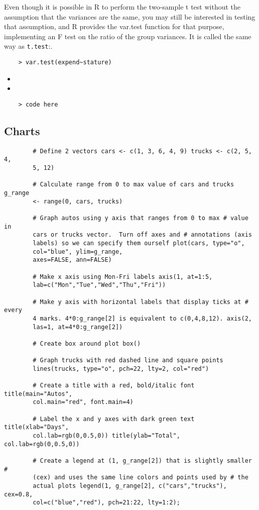 \documentclass[a4paper,12pt]{article}
\begin{document}
	
	Even though it is possible in R to perform the two-sample t test without
	the assumption that the variances are the same, you may still be interested
	in testing that assumption, and R provides the var.test function for that
	purpose, implementing an F test on the ratio of the group variances. It is
	called the same way as \texttt{t.test}:.
	\begin{verbatim}
	> var.test(expend~stature)
	\end{verbatim}
	\begin{itemize}
		\item
		\item
	\end{itemize}
	\large \begin{verbatim}
	> code here
	\end{verbatim}\large
	
	
	\subsection{ Charts}
	
	\begin{framed}
		\begin{verbatim}
		# Define 2 vectors cars <- c(1, 3, 6, 4, 9) trucks <- c(2, 5, 4,
		5, 12)
		
		# Calculate range from 0 to max value of cars and trucks g_range
		<- range(0, cars, trucks)
		
		# Graph autos using y axis that ranges from 0 to max # value in
		cars or trucks vector.  Turn off axes and # annotations (axis
		labels) so we can specify them ourself plot(cars, type="o",
		col="blue", ylim=g_range,
		axes=FALSE, ann=FALSE)
		
		# Make x axis using Mon-Fri labels axis(1, at=1:5,
		lab=c("Mon","Tue","Wed","Thu","Fri"))
		
		# Make y axis with horizontal labels that display ticks at # every
		4 marks. 4*0:g_range[2] is equivalent to c(0,4,8,12). axis(2,
		las=1, at=4*0:g_range[2])
		
		# Create box around plot box()
		
		# Graph trucks with red dashed line and square points
		lines(trucks, type="o", pch=22, lty=2, col="red")
		
		# Create a title with a red, bold/italic font title(main="Autos",
		col.main="red", font.main=4)
		
		# Label the x and y axes with dark green text title(xlab="Days",
		col.lab=rgb(0,0.5,0)) title(ylab="Total", col.lab=rgb(0,0.5,0))
		
		# Create a legend at (1, g_range[2]) that is slightly smaller #
		(cex) and uses the same line colors and points used by # the
		actual plots legend(1, g_range[2], c("cars","trucks"), cex=0.8,
		col=c("blue","red"), pch=21:22, lty=1:2);
		
		\end{verbatim}
	\end{framed}
\end{document}
